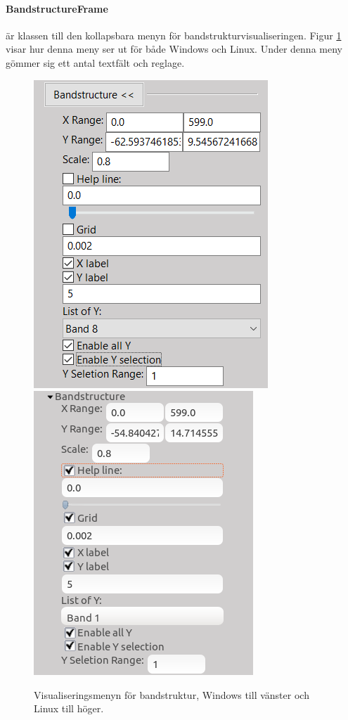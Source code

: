 \paragraph{BandstructureFrame} är klassen till den kollapsbara menyn för bandstrukturvisualiseringen. Figur \ref{fig:GUIBand} visar hur denna meny ser ut för både Windows och Linux. Under denna meny gömmer sig ett antal textfält och reglage.
\begin{figure}[H]
  \centering
    \includegraphics[scale=0.5]{images/GUI/GUIBandWin.png}
    \includegraphics[scale=0.542]{images/GUI/GUIBandLinux.png}
    \caption{Visualiseringsmenyn för bandstruktur, Windows till vänster och Linux till höger.}
    \label{fig:GUIBand}
\end{figure}

